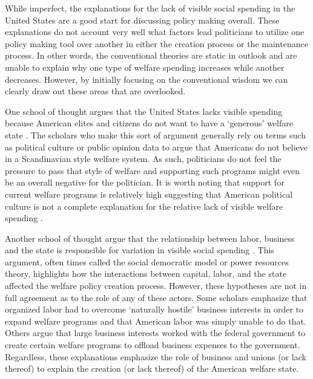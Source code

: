 \documentclass[12pt]{article}
\begin{document}
While imperfect, the explanations for the lack of visible social spending in the United States are a good start for discussing policy making overall. These explanations do not account very well what factors lead politicians to utilize one policy making tool over another in either the creation process or the maintenance process. In other words, the conventional theories are static in outlook and are unable to explain why one type of welfare spending increases while another decreases. However, by initially focusing on the conventional wisdom we can clearly draw out these areas that are overlooked.

One school of thought argues that the United States lacks visible spending because American elites and citizens do not want to have a `generous' welfare state \citep{king1973}. The scholars who make this sort of argument generally rely on terms such as political culture or public opinion data to argue that Americans do not believe in a Scandinavian style welfare system. As such, politicians do not feel the pressure to pass that style of welfare and supporting such programs might even be an overall negative for the politician. It is worth noting that support for current welfare programs is relatively high suggesting that American political culture is not a complete explanation for the relative lack of visible welfare spending \citep[Ch. 6]{howard2008}.

Another school of thought argue that the relationship between labor, business and the state is responsible for variation in visible social spending \citep{korpi1980, swenson2004}. This argument, often times called the social democratic model or power resources theory, highlights how the interactions between capital, labor, and the state affected the welfare policy creation process. However, these hypotheses are not in full agreement as to the role of any of these actors. Some scholars emphasize that organized labor had to overcome `naturally hostile' business interests in order to expand welfare programs and that American labor was simply unable to do that. Others argue that large business interests worked with the federal government to create certain welfare programs to offload business expenses to the government. Regardless, these explanations emphasize the role of business and unions (or lack thereof) to explain the creation (or lack thereof) of the American welfare state. 
\end{document}
